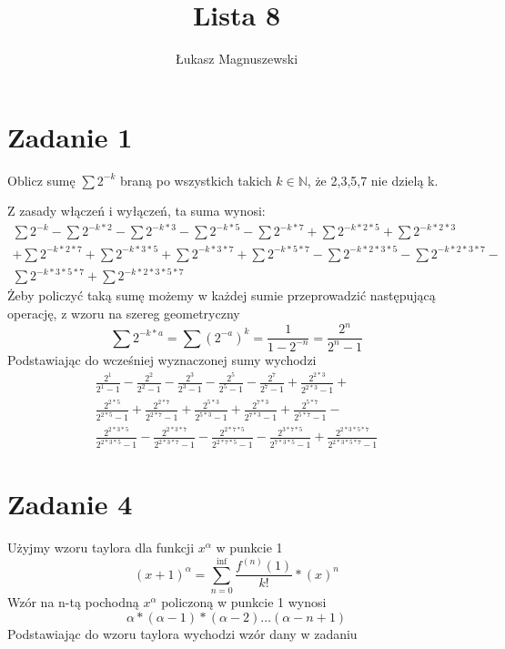 \documentclass{article}
\title{Lista 8}
\author{Łukasz Magnuszewski}
\date{\vspace{-5ex}}
\begin{document}
\maketitle
\section*{Zadanie 1}
Oblicz sumę $\sum 2^{-k}$ braną po wszystkich takich $k \in \mathbb{N}$, że 2,3,5,7 nie dzielą k.


Z zasady włączeń i wyłączeń, ta suma wynosi:
\begin{equation}
    \begin{split}
  \sum 2^{-k} - \sum 2^{-k *2} - \sum 2^{-k* 3} - \sum 2^{-k *5} - \sum 2^{-k *7} +\sum 2^{-k * 2 *5} +\sum 2^{-k *2 *3} \\ +\sum 2^{-k *2 *7} + \sum 2^{-k* 3* 5} + \sum 2^{-k* 3* 7} + \sum 2^{-k *5 *7} -   \sum 2^{-k *2 *3 * 5} - \sum 2^{-k *2 *3 *7} -\\ \sum 2^{-k *3 *5 * 7} + \sum 2^{-k *2 *3 *5 *7}
\end{split}
\end{equation}
Żeby policzyć taką sumę możemy w każdej sumie przeprowadzić następującą operację, z wzoru na szereg geometryczny
\[ \sum 2^{-k * a} = \sum (2^{-a})^k = \frac{1}{1-2^{-n}} =\frac{2^n}{2^n - 1} \]
Podstawiając do wcześniej wyznaczonej sumy wychodzi
\begin{equation}
    \begin{split}
  \frac{2^{1}}{2^{1}-1} - \frac{2^{2}}{2^{2}-1}- \frac{2^{3}}{2^{3}-1}- \frac{2^{5}}{2^{5}-1} - \frac{2^{7}}{2^{7}-1} +  \frac{2^{2*3}}{2^{2*3}-1} + \\ \frac{2^{2*5}}{2^{2*5}-1} +  \frac{2^{2*7}}{2^{2*7}-1} +  \frac{2^{5*3}}{2^{5*3}-1} +  \frac{2^{7*3}}{2^{7*3}-1} +  \frac{2^{5*7}}{2^{5*7}-1} - \\ \frac{2^{2*3*5}}{2^{2*3*5}-1} -  \frac{2^{2*3*7}}{2^{2*3*7}-1} -  \frac{2^{2*7*5}}{2^{2*7*5}-1} -  \frac{2^{3*7*5}}{2^{7*3*5}-1} +   \frac{2^{2*3*5*7}}{2^{2*3*5*7}-1}
\end{split}
\end{equation}

\section*{Zadanie 4}
Użyjmy wzoru taylora dla funkcji $x^{\alpha}$ w punkcie 1
\[ (x+1)^{\alpha} = \sum^{\inf}_{n=0} \frac{f^{(n)}(1)}{k!} * (x)^n
\]
Wzór na n-tą pochodną $x^{\alpha}$ policzoną w punkcie 1 wynosi
\[
  \alpha * (\alpha - 1) * (\alpha -2) \dots (\alpha - n + 1) 
\]
Podstawiając do wzoru taylora wychodzi wzór dany w zadaniu
\end{document}
